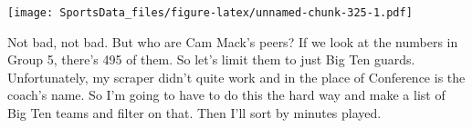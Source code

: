 \documentclass[
]{book}
\newenvironment{Shaded}{\begin{snugshade}}{\end{snugshade}}
\newcommand{\DecValTok}[1]{\textcolor[rgb]{0.00,0.00,0.81}{#1}}
\newcommand{\KeywordTok}[1]{\textcolor[rgb]{0.13,0.29,0.53}{\textbf{#1}}}
\newcommand{\NormalTok}[1]{#1}
\newcommand{\OperatorTok}[1]{\textcolor[rgb]{0.81,0.36,0.00}{\textbf{#1}}}
\newcommand{\StringTok}[1]{\textcolor[rgb]{0.31,0.60,0.02}{#1}}
\begin{document}
\texttt{[image: SportsData\_files/figure-latex/unnamed-chunk-325-1.pdf]}

Not bad, not bad. But who are Cam Mack's peers? If we look at the numbers in Group 5, there's 495 of them. So let's limit them to just Big Ten guards. Unfortunately, my scraper didn't quite work and in the place of Conference is the coach's name. So I'm going to have to do this the hard way and make a list of Big Ten teams and filter on that. Then I'll sort by minutes played.

\begin{Shaded}
\end{Shaded}
\end{document}
